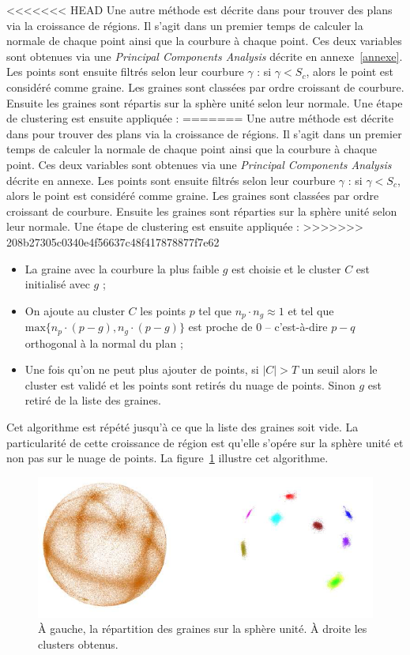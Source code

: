 ﻿\documentclass[12pt, twoside]{article}
\begin{document}
<<<<<<< HEAD
Une autre méthode est décrite dans \cite{reggrow3} pour trouver des plans via la croissance de régions. Il s'agit dans un premier temps de calculer la normale de chaque point ainsi que la courbure à chaque point. Ces deux variables sont obtenues via une \textit{Principal Components Analysis} décrite en annexe~\ref{annexe}. Les points sont ensuite filtrés selon leur courbure $\gamma$ : si $\gamma < S_c$, alors le point est considéré comme graine. Les graines sont classées par ordre croissant de courbure. Ensuite les graines sont répartis sur la sphère unité selon leur normale. Une étape de clustering est ensuite appliquée :
=======
Une autre méthode est décrite dans \cite{reggrow3} pour trouver des plans via la croissance de régions. Il s'agit dans un premier temps de calculer la normale de chaque point ainsi que la courbure à chaque point. Ces deux variables sont obtenues via une \textit{Principal Components Analysis} décrite en annexe. Les points sont ensuite filtrés selon leur courbure $\gamma$ : si $\gamma < S_c$, alors le point est considéré comme graine. Les graines sont classées par ordre croissant de courbure. Ensuite les graines sont réparties sur la sphère unité selon leur normale. Une étape de clustering est ensuite appliquée :
>>>>>>> 208b27305c0340e4f56637c48f417878877f7e62
\begin{itemize}
  \item La graine avec la courbure la plus faible $g$ est choisie et le cluster $C$ est initialisé avec $g$ ;
  \item On ajoute au cluster $C$ les points $p$ tel que $n_p\cdot n_g \approx 1$ et tel que $\text{max}\{n_p\cdot(p-g), n_g\cdot(p-g)\}$ est proche de 0 -- c'est-à-dire $p-q$ orthogonal à la normal du plan ;
  \item Une fois qu'on ne peut plus ajouter de points, si $\vert C\vert > T$ un seuil alors le cluster est validé et les points sont retirés du nuage de points. Sinon $g$ est retiré de la liste des graines.
\end{itemize}
Cet algorithme est répété jusqu'à ce que la liste des graines soit vide. La particularité de cette croissance de région est qu'elle s'opére sur la sphère unité et non pas sur le nuage de points. La figure~\ref{fig:GaussMap} illustre cet algorithme.

\begin{figure}[h]
\centering
\includegraphics[scale=0.65]{GaussMap.png}
\caption{\label{fig:GaussMap} À gauche, la répartition des graines sur la sphère unité. À droite les clusters obtenus.}
\end{figure}
\end{document}
